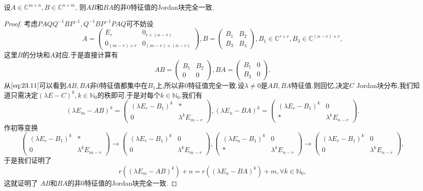 \documentclass[../../main.tex]{subfiles}
\begin{document}
\begin{theorem}\label{theorem:AB和BA的非0特征值的Jordan块完全一致}
设\( A \in \mathbb{C}^{m \times n}, B \in \mathbb{C}^{n \times m} \), 则\( AB \)和\( BA \)的非0特征值的Jordan块完全一致.
\end{theorem}
\begin{proof}
考虑\( PAQ Q^{-1} BP^{-1}, Q^{-1} BP^{-1} PAQ \)可不妨设
\[
A = \begin{pmatrix}
E_r & 0_{r \times (n - r)} \\
0_{(m - r) \times r} & 0_{(m - r) \times (n - r)}
\end{pmatrix}, B = \begin{pmatrix}
B_1 & B_2 \\
B_3 & B_4
\end{pmatrix}, B_1 \in \mathbb{C}^{r \times r}, B_3 \in \mathbb{C}^{(n - r) \times r},
\]
这里\( B \)的分块和\( A \)对应.于是直接计算有
\[
AB = \begin{pmatrix}
B_1 & B_2 \\
0 & 0
\end{pmatrix}, BA = \begin{pmatrix}
B_1 & 0 \\
B_3 & 0
\end{pmatrix}. \label{eq:23.11}
\]
从\(\eqref{eq:23.11}\)可以看到\( AB, BA \)非0特征值都集中在\( B_1 \)上,所以非0特征值完全一致.设\( \lambda \neq 0 \)是\( AB, BA \)特征值.则回忆,决定\( C \) Jordan块分布,我们知道只需决定\( (\lambda E - C)^k, k \in \mathbb{N}_0 \)的秩即可.于是对每个\( k \in \mathbb{N}_0 \),我们有
\[
(\lambda E_m - AB)^k = \begin{pmatrix}
(\lambda E_r - B_1)^k & * \\
0 & \lambda^k E_{m - r}
\end{pmatrix}, (\lambda E_n - BA)^k = \begin{pmatrix}
(\lambda E_r - B_1)^k & 0 \\
* & \lambda^k E_{n - r}
\end{pmatrix}.
\]
作初等变换
\[
\begin{pmatrix}
(\lambda E_r - B_1)^k & * \\
0 & \lambda^k E_{m - r}
\end{pmatrix} \to \begin{pmatrix}
(\lambda E_r - B_1)^k & 0 \\
0 & \lambda^k E_{m - r}
\end{pmatrix}, \begin{pmatrix}
(\lambda E_n - B_1)^k & 0 \\
* & \lambda^k E_{n - r}
\end{pmatrix} \to \begin{pmatrix}
(\lambda E_r - B_1)^k & 0 \\
0 & \lambda^k E_{n - r}
\end{pmatrix},
\]
于是我们证明了
\[
r\left( (\lambda E_m - AB)^k \right) + n = r\left( (\lambda E_n - BA)^k \right) + m, \forall k \in \mathbb{N}_0,
\]
这就证明了 \( AB \)和\( BA \)的非0特征值的Jordan块完全一致.
\end{proof}
\end{document}

